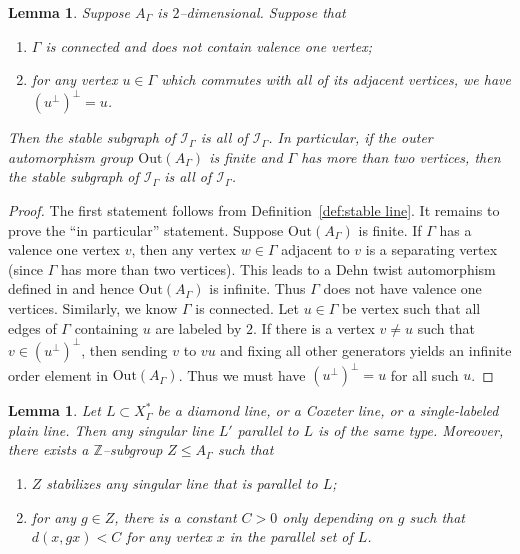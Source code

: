 \documentclass[11pt]{amsart}
\newcommand {\I}{\mathcal I}
\newtheorem{lemma}[theorem]{Lemma}
\theoremstyle{definition}
\newcommand{\Xa}{X^{\ast}}
\begin{document}
\begin{lemma}
	\label{lem:finite out}
	Suppose $A_\Gamma$ is $2$--dimensional. Suppose that
	\begin{enumerate}
		\item $\Gamma$ is connected and does not contain valence one vertex;
		\item for any vertex $u\in\Gamma$ which commutes with all of its adjacent vertices, we have $(u^\perp)^\perp=u$.
	\end{enumerate}
Then the stable subgraph of $\I_\Gamma$ is all of $\I_\Gamma$. In particular, if the outer automorphism group $\mathrm{Out}(A_\Gamma)$ is finite and $\Gamma$ has more than two vertices, then the stable subgraph of $\I_\Gamma$ is all of $\I_\Gamma$.
\end{lemma}

\begin{proof}
The first statement follows from Definition~\ref{def:stable line}. It remains to prove the ``in particular'' statement. Suppose $\mathrm{Out}(A_\Gamma)$ is finite.
If $\Gamma$ has a valence one vertex $v$, then any vertex $w\in\Gamma$ adjacent to $v$ is a separating vertex (since $\Gamma$ has more than two vertices). This leads to a Dehn twist automorphism defined in \cite[pp.\ 1383]{MR2174269} and hence $\mathrm{Out}(A_\Gamma)$ is infinite. Thus $\Gamma$ does not have valence one vertices. Similarly, we know $\Gamma$ is connected. Let $u\in\Gamma$ be vertex such that all edges of $\Gamma$ containing $u$ are labeled by $2$. If there is a vertex $v\neq u$ such that $v\in (u^\perp)^\perp$, then sending $v$ to $vu$ and fixing all other generators yields an infinite order element in $\mathrm{Out}(A_\Gamma)$. Thus we must have $(u^\perp)^\perp=u$ for all such $u$. 
\end{proof}

\begin{lemma}
	\label{lem:uniform}
	Let $L\subset\Xa_\Gamma$ be a diamond line, or a Coxeter line, or a single-labeled plain line. Then any singular line $L'$ parallel to $L$ is of the same type. Moreover, there exists a $\mathbb Z$--subgroup $Z\le A_\Gamma$ such that 
	\begin{enumerate}
		\item $Z$ stabilizes any singular line that is parallel to $L$;
		\item for any $g\in Z$, there is a constant $C>0$ only depending on $g$ such that $d(x,gx)<C$ for any vertex $x$ in the parallel set of $L$.
	\end{enumerate}
\end{lemma}
\end{document}
